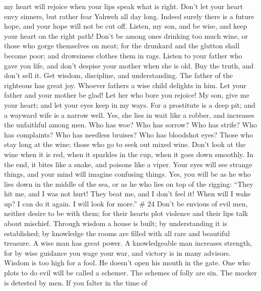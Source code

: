 my heart will rejoice when your lips speak what is right. 
Don't let your heart envy sinners, but rather fear Yahweh all day long.
 Indeed surely there is a future hope, and your hope will
not be cut off.  Listen, my son, and be wise, and keep your
heart on the right path!  Don't be among ones drinking too
much wine, or those who gorge themselves on meat;  for the
drunkard and the glutton shall become poor; and drowsiness clothes them
in rags.  Listen to your father who gave you life, and
don't despise your mother when she is old.  Buy the truth,
and don't sell it. Get wisdom, discipline, and understanding.
 The father of the righteous has great joy. Whoever fathers
a wise child delights in him.  Let your father and your
mother be glad! Let her who bore you rejoice!  My son, give
me your heart; and let your eyes keep in my ways.  For a
prostitute is a deep pit; and a wayward wife is a narrow well.
 Yes, she lies in wait like a robber, and increases the
unfaithful among men.  Who has woe? Who has sorrow? Who has
strife? Who has complaints? Who has needless bruises? Who has bloodshot
eyes?  Those who stay long at the wine; those who go to
seek out mixed wine.  Don't look at the wine when it is
red, when it sparkles in the cup, when it goes down smoothly.
 In the end, it bites like a snake, and poisons like a
viper.  Your eyes will see strange things, and your mind
will imagine confusing things.  Yes, you will be as he who
lies down in the middle of the sea, or as he who lies on top of the
rigging:  ``They hit me, and I was not hurt! They beat me,
and I don't feel it! When will I wake up? I can do it again. I will look
for more.'' \# 24  Don't be envious of evil men, neither
desire to be with them;  for their hearts plot violence and
their lips talk about mischief.  Through wisdom a house is
built; by understanding it is established;  by knowledge the
rooms are filled with all rare and beautiful treasure.  A
wise man has great power. A knowledgeable man increases strength,
 for by wise guidance you wage your war, and victory is in
many advisors.  Wisdom is too high for a fool. He doesn't
open his mouth in the gate.  One who plots to do evil will
be called a schemer.  The schemes of folly are sin. The
mocker is detested by men.  If you falter in the time of
